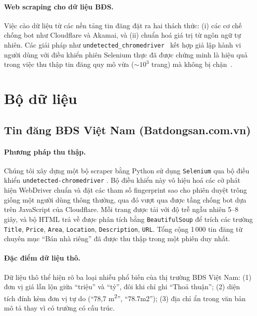 \documentclass[sigconf,nonacm]{acmart}
\begin{document}
\paragraph{Web scraping cho dữ liệu BĐS.}
Việc cào dữ liệu từ các nền tảng tin đăng đặt ra hai thách thức:
(i) các cơ chế chống bot như Cloudflare và Akamai, và (ii) chuẩn
hoá giá trị từ ngôn ngữ tự nhiên. Các giải pháp như
\texttt{undetected\_chromedriver}~\cite{undetectedcdp} kết hợp giả
lập hành vi người dùng với điều khiển phiên Selenium thực đã được
chứng minh là hiệu quả trong việc thu thập tin đăng quy mô vừa
(${\sim}10^3$ trang) mà không bị chặn~\cite{wahyudi2021scraping}.

\section{Bộ dữ liệu}\label{sec:datasets}

\subsection{Tin đăng BĐS Việt Nam (Batdongsan.com.vn)}

\paragraph{Phương pháp thu thập.}
Chúng tôi xây dựng một bộ scraper bằng Python sử dụng
\texttt{Selenium} qua bộ điều khiển \texttt{undetected-chromedriver}
\cite{undetectedcdp}. Bộ điều khiển này vô hiệu hoá các cờ phát hiện
WebDriver chuẩn và đặt các tham số fingerprint sao cho phiên duyệt
trông giống một người dùng thông thường, qua đó vượt qua được tầng
chống bot dựa trên JavaScript của Cloudflare. Mỗi trang được tải với
độ trễ ngẫu nhiên 5--8 giây, và bộ HTML trả về được phân tích bằng
\texttt{BeautifulSoup} để trích các trường \texttt{Title}, \texttt{Price},
\texttt{Area}, \texttt{Location}, \texttt{Description}, \texttt{URL}.
Tổng cộng 1\,000 tin đăng từ chuyên mục ``Bán nhà riêng'' đã được thu
thập trong một phiên duy nhất.

\paragraph{Đặc điểm dữ liệu thô.}
Dữ liệu thô thể hiện rõ ba loại nhiễu phổ biến của thị trường BĐS Việt
Nam: (1) đơn vị giá lẫn lộn giữa ``triệu'' và ``tỷ'', đôi khi chỉ
ghi ``Thoả thuận''; (2) diện tích đính kèm đơn vị tự do (``78,7
m\textsuperscript{2}'', ``78.7m2''); (3) địa chỉ ẩn trong văn bản
mô tả thay vì có trường có cấu trúc.
\end{document}
